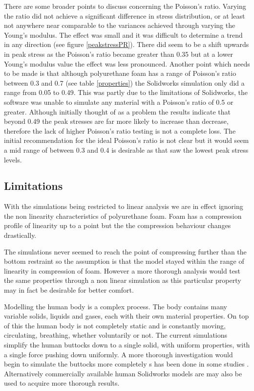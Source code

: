 \documentclass[conference]{IEEEtran}
\begin{document}
There are some broader points to discuss concerning the Poisson's ratio. Varying the ratio did not achieve a significant difference in stress distribution, or at least not anywhere near comparable to the variances achieved through varying the Young's modulus. The effect was small and it was difficult to determine a trend in any direction (see figure \ref{peakstressPR}). There did seem to be a shift upwards in peak stress as the Poisson's ratio became greater than 0.35 but at a lower Young's modulus value the effect was less pronounced. Another point which needs to be made is that although polyurethane foam has a range of Poisson's ratio between 0.3 and 0.7 (see table \ref{properties}) the Solidworks simulation only did a range from 0.05 to 0.49. This was partly due to the limitations of Solidworks, the software was unable to simulate any material with a Poisson's ratio of 0.5 or greater. Although initially thought of as a problem the results indicate that beyond 0.49 the peak stresses are far more likely to increase than decrease, therefore the lack of higher Poisson's ratio testing is not a complete loss. The initial recommendation for the ideal Poisson's ratio is not clear but it would seem a mid range of between 0.3 and 0.4 is desirable as that saw the lowest peak stress levels.



    \subsection{Limitations}
    With the simulations being restricted to linear analysis we are in effect ignoring the non linearity characteristics of polyurethane foam. Foam has a compression profile of linearity up to a point but the the compression behaviour changes drastically. 
    
  
    The simulations never seemed to reach the point of compressing further than the bottom restraint so the assumption is that the model stayed within the range of linearity in compression of foam. However a more thorough analysis would test the same properties through a non linear simulation as this particular property may in fact be desirable for better comfort.

    Modelling the human body is a complex process. The body contains many variable solids, liquids and gases, each with their own material properties. On top of this the human body is not completely static and is constantly moving, circulating, breathing, whether voluntarily or not. The current simulations simplify the human buttocks down to a single solid, with uniform properties, with a single force pushing down uniformly. A more thorough investigation would begin to simulate the buttocks more completely s has been done in some studies \cite{Shu2009}. Alternatively commercially available human Solidworks models are may also be used to acquire more thorough results.
    
\end{document}
